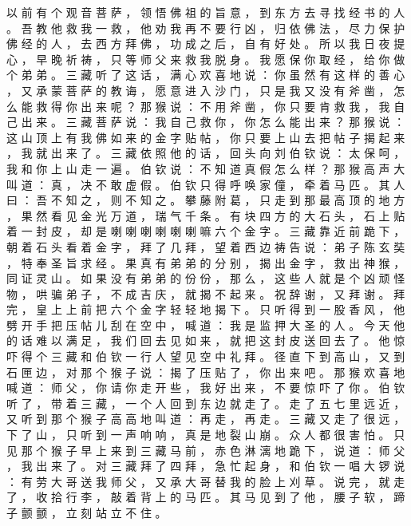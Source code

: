 {以 前 有 个 观 音 菩 萨 ， 领 悟 佛 祖 的 旨 意 ， 到 东 方 去 寻 找 经 书 的 人 。
吾 教 他 救 我 一 救 ， 他 劝 我 再 不 要 行 凶 ， 归 依 佛 法 ， 尽 力 保 护 佛 经 的 人 ， 去 西 方 拜 佛 ， 功 成 之 后 ， 自 有 好 处 。
所 以 我 日 夜 提 心 ， 早 晚 祈 祷 ， 只 等 师 父 来 救 我 脱 身 。
我 愿 保 你 取 经 ， 给 你 做 个 弟 弟 。
三 藏 听 了 这 话 ， 满 心 欢 喜 地 说 ： 你 虽 然 有 这 样 的 善 心 ， 又 承 蒙 菩 萨 的 教 诲 ， 愿 意 进 入 沙 门 ， 只 是 我 又 没 有 斧 凿 ， 怎 么 能 救 得 你 出 来 呢 ？ 那 猴 说 ： 不 用 斧 凿 ， 你 只 要 肯 救 我 ， 我 自 己 出 来 。
三 藏 菩 萨 说 ： 我 自 己 救 你 ， 你 怎 么 能 出 来 ？ 那 猴 说 ： 这 山 顶 上 有 我 佛 如 来 的 金 字 贴 帖 ， 你 只 要 上 山 去 把 帖 子 揭 起 来 ， 我 就 出 来 了 。
三 藏 依 照 他 的 话 ， 回 头 向 刘 伯 钦 说 ： 太 保 呵 ， 我 和 你 上 山 走 一 遍 。
伯 钦 说 ： 不 知 道 真 假 怎 么 样 ？ 那 猴 高 声 大 叫 道 ： 真 ， 决 不 敢 虚 假 。
伯 钦 只 得 呼 唤 家 僮 ， 牵 着 马 匹 。
其 人 曰 ： 吾 不 知 之 ， 则 不 知 之 。
攀 藤 附 葛 ， 只 走 到 那 最 高 顶 的 地 方 ， 果 然 看 见 金 光 万 道 ， 瑞 气 千 条 。 有 块 四 方 的 大 石 头 ， 石 上 贴 着 一 封 皮 ， 却 是 喇 喇 喇 喇 喇 喇 嘛 六 个 金 字 。
三 藏 靠 近 前 跪 下 ， 朝 着 石 头 看 着 金 字 ， 拜 了 几 拜 ， 望 着 西 边 祷 告 说 ： 弟 子 陈 玄 奘 ， 特 奉 圣 旨 求 经 。
果 真 有 弟 弟 的 分 别 ， 揭 出 金 字 ， 救 出 神 猴 ， 同 证 灵 山 。 如 果 没 有 弟 弟 的 份 份 ， 那 么 ， 这 些 人 就 是 个 凶 顽 怪 物 ， 哄 骗 弟 子 ， 不 成 吉 庆 ， 就 揭 不 起 来 。
祝 辞 谢 ， 又 拜 谢 。
拜 完 ， 皇 上 上 前 把 六 个 金 字 轻 轻 地 揭 下 。
只 听 得 到 一 股 香 风 ， 他 劈 开 手 把 压 帖 儿 刮 在 空 中 ， 喊 道 ： 我 是 监 押 大 圣 的 人 。
今 天 他 的 话 难 以 满 足 ， 我 们 回 去 见 如 来 ， 就 把 这 封 皮 送 回 去 了 。
他 惊 吓 得 个 三 藏 和 伯 钦 一 行 人 望 见 空 中 礼 拜 。
径 直 下 到 高 山 ， 又 到 石 匣 边 ， 对 那 个 猴 子 说 ： 揭 了 压 贴 了 ， 你 出 来 吧 。
那 猴 欢 喜 地 喊 道 ： 师 父 ， 你 请 你 走 开 些 ， 我 好 出 来 ， 不 要 惊 吓 了 你 。
伯 钦 听 了 ， 带 着 三 藏 ， 一 个 人 回 到 东 边 就 走 了 。
走 了 五 七 里 远 近 ， 又 听 到 那 个 猴 子 高 高 地 叫 道 ： 再 走 ， 再 走 。
三 藏 又 走 了 很 远 ， 下 了 山 ， 只 听 到 一 声 响 响 ， 真 是 地 裂 山 崩 。
众 人 都 很 害 怕 。
只 见 那 个 猴 子 早 上 来 到 三 藏 马 前 ， 赤 色 淋 漓 地 跪 下 ， 说 道 ： 师 父 ， 我 出 来 了 。
对 三 藏 拜 了 四 拜 ， 急 忙 起 身 ， 和 伯 钦 一 唱 大 锣 说 ： 有 劳 大 哥 送 我 师 父 ， 又 承 大 哥 替 我 的 脸 上 刈 草 。
说 完 ， 就 走 了 ， 收 拾 行 李 ， 敲 着 背 上 的 马 匹 。
其 马 见 到 了 他 ， 腰 子 软 ， 蹄 子 颤 颤 ， 立 刻 站 立 不 住 。
}
